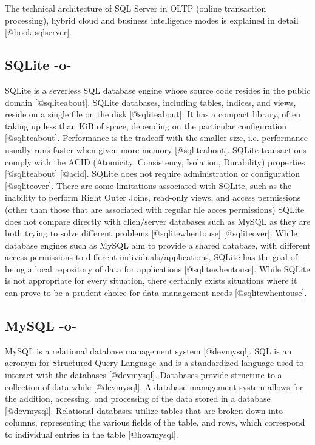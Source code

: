         The technical architecture of SQL Server in OLTP (online
        transaction processing), hybrid cloud and business
        intelligence modes is explained in
        detail [@book-sqlserver].





\subsection{SQLite -o-}

SQLite is a severless SQL database engine whose source code resides in
the public domain [@sqliteabout]. SQLite databases, including
tables, indices, and views, reside on a single file on the
disk [@sqliteabout]. It has a compact library, often taking up
less than KiB of space, depending on the particular
configuration [@sqliteabout]. Performance is the tradeoff with the
smaller size, i.e. performance usually runs faster when given more
memory [@sqliteabout]. SQLite transactions comply with the ACID
(Atomicity, Consistency, Isolation, Durability)
properties [@sqliteabout] [@acid]. SQLite does not require
administration or configuration [@sqliteover]. There are some
limitations associated with SQLite, such as the inability to perform
Right Outer Joins, read-only views, and access permissions (other than
those that are associated with regular file acces permissions) SQLite
does not compare directly with clien/server databases such as MySQL as
they are both trying to solve different
problems [@sqlitewhentouse] [@sqliteover].  While database
engines such as MySQL aim to provide a shared database, with different
access permissions to different individuals/applications, SQLite has
the goal of being a local repository of data for
applications [@sqlitewhentouse]. While SQLite is not appropriate
for every situation, there certainly exists situations where it can
prove to be a prudent choice for data management
needs [@sqlitewhentouse].


     
\subsection{MySQL -o-}

MySQL is a relational database management system [@devmysql]. SQL
is an acronym for Structured Query Language and is a standardized
language used to interact with the databases [@devmysql].
Databases provide structure to a collection of data
while [@devmysql]. A database management system allows for the
addition, accessing, and processing of the data stored in a
database [@devmysql]. Relational databases utilize tables that are
broken down into columns, representing the various fields of the
table, and rows, which correspond to individual entries in the
table [@howmysql].


